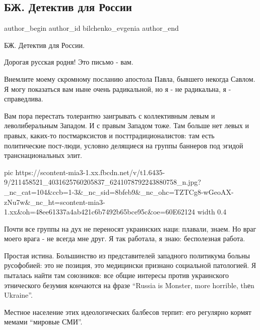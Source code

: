 
 
 
 
 
 
\subsection{БЖ. Детектив для России}
\label{sec:03_07_2021.fb.bilchenko_evgenia.1.detektiv_dlja_rossii}
\ifcmt
 author_begin
   author_id bilchenko_evgenia
 author_end
\fi

БЖ. Детектив для России.

Дорогая русская родня! Это письмо - вам.

Внемлите моему скромному посланию апостола Павла, бывшего некогда Савлом. Я
могу показаться вам ныне очень радикальной, но я - не радикальна, я -
справедлива. 

Вам пора перестать толерантно заигрывать с коллективным левым и леволиберальным
Западом. И с правым Западом тоже. Там больше нет левых и правых, каких-то
постмарксистов и посттрадиционалистов: там есть политические пост-люди, условно
делящиеся на группы баннеров под эгидой транснациональных элит. 

\ifcmt
  pic https://scontent-mia3-1.xx.fbcdn.net/v/t1.6435-9/211458521_4031625760205837_6241078792243880758_n.jpg?_nc_cat=104&ccb=1-3&_nc_sid=8bfeb9&_nc_ohc=TZTCg8-wGeoAX-zNu7w&_nc_ht=scontent-mia3-1.xx&oh=48ee61337a4ab421c6b7492b65bce95c&oe=60E62124
  width 0.4
\fi

Почти все группы на дух не переносят украинских наци: плавали, знаем. Но враг
моего врага - не всегда мне друг. Я так работала, я знаю: бесполезная работа.

Простая истина. Большинство из представителей западного политикума больны
русофобией: это не позиция, это медицински признано социальной патологией. Я
пыталась найти там союзников: все общие интересы против украинского этнического
безумия кончаются на фразе \enquote{Russia is Monster, more horrible, thеn Ukraine}.

Местное население этих идеологических балбесов терпит: его регулярно кормят
мемами \enquote{мировые СМИ}.


